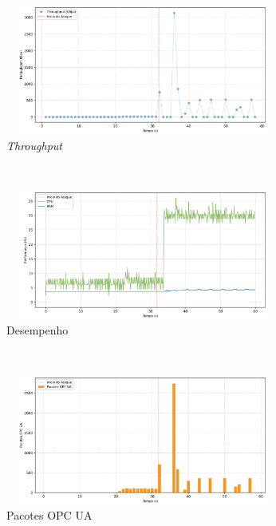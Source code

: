 \begin{apendicesenv}
\begin{figure}[htbp!]
    \centering
    \caption{\label{fig:0-dos_function_call_null_deref}Gráficos do ataque de DoS pela chamada da função \textit{Dereference} nula - nível de segurança: `None'.}
    \begin{subfigure}[t]{0.5\textwidth}
        \centering
        \caption{\textit{Throughput}}
        \includegraphics[width=1\textwidth, height=120pt]{USPSC-img/output/cropped/0-dos_function_call_null_deref-tput.png}
    \end{subfigure}%
    ~ 
    \begin{subfigure}[t]{0.5\textwidth}
        \centering
        \caption{Desempenho}
        \includegraphics[width=1\textwidth, height=120pt]{USPSC-img/output/cropped/0-dos_function_call_null_deref-perf.png}
    \end{subfigure}%
    \\
    \begin{subfigure}[t]{0.5\textwidth}
        \centering
        \caption{Pacotes OPC UA}
        \includegraphics[width=1\textwidth, height=120pt]{USPSC-img/output/cropped/0-dos_function_call_null_deref-pack.png}
    \end{subfigure}%
    ~
    \begin{subfigure}[t]{0.5\textwidth}

\end{subfigure}
\end{figure}
\end{apendicesenv}
